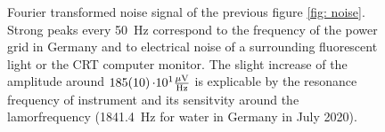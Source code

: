 \begin{figure}[H]
    \centering
    
    \caption[Fourier transformed noise signal of the previous figure \ref{fig: noise}.]{Fourier transformed noise signal of the previous figure \ref{fig: noise}. Strong peaks every \SI{50}{\hertz} correspond to the frequency of the power grid in Germany and to electrical noise of a surrounding fluorescent light or the CRT computer monitor. The slight increase of the amplitude around $\SI{185 \pm 10}{\cdot 10^1 \frac{\mu \volt}{\hertz}}$ is explicable by the resonance frequency of instrument and its sensitvity around the lamorfrequency (\SI{1841.4}{\hertz} for water in Germany in July 2020).}
    \label{fig: MonitorNoise138}
\end{figure}

